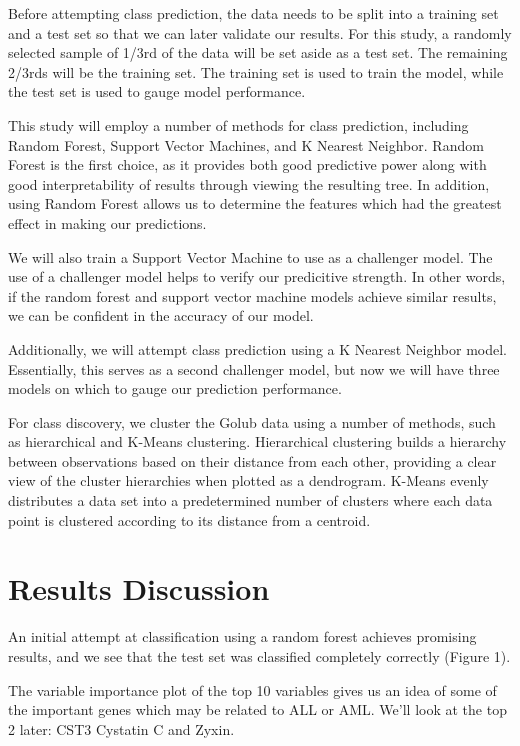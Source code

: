 \documentclass[]{article}
\begin{document}
Before attempting class prediction, the data needs to be split into a
training set and a test set so that we can later validate our results.
For this study, a randomly selected sample of 1/3rd of the data will be
set aside as a test set. The remaining 2/3rds will be the training set.
The training set is used to train the model, while the test set is used
to gauge model performance.

This study will employ a number of methods for class prediction,
including Random Forest, Support Vector Machines, and K Nearest
Neighbor. Random Forest is the first choice, as it provides both good
predictive power along with good interpretability of results through
viewing the resulting tree. In addition, using Random Forest allows us
to determine the features which had the greatest effect in making our
predictions.

We will also train a Support Vector Machine to use as a challenger
model. The use of a challenger model helps to verify our predicitive
strength. In other words, if the random forest and support vector
machine models achieve similar results, we can be confident in the
accuracy of our model.

Additionally, we will attempt class prediction using a K Nearest
Neighbor model. Essentially, this serves as a second challenger model,
but now we will have three models on which to gauge our prediction
performance.

For class discovery, we cluster the Golub data using a number of
methods, such as hierarchical and K-Means clustering. Hierarchical
clustering builds a hierarchy between observations based on their
distance from each other, providing a clear view of the cluster
hierarchies when plotted as a dendrogram. K-Means evenly distributes a
data set into a predetermined number of clusters where each data point
is clustered according to its distance from a centroid.

\section{Results Discussion}\label{results-discussion}

An initial attempt at classification using a random forest achieves
promising results, and we see that the test set was classified
completely correctly (Figure 1).

The variable importance plot of the top 10 variables gives us an idea of
some of the important genes which may be related to ALL or AML. We'll
look at the top 2 later: CST3 Cystatin C and Zyxin.
\end{document}

